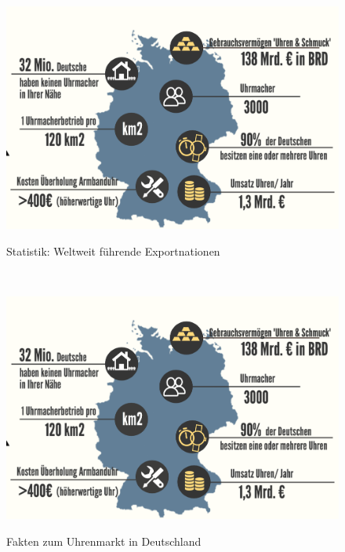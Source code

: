\begin{figure}[!h]
	\centering
	\includegraphics[scale=0.25]{statistiken/uhrenmarkt_info.png}
	\label{fig:abb1}
	\caption{Statistik: Weltweit führende Exportnationen} 
\end{figure}
\\
\begin{figure}[!h]
	\centering
	\includegraphics[scale=0.25]{statistiken/uhrenmarkt_info.png}
	\label{fig:abb1}
	\caption{Fakten zum Uhrenmarkt in Deutschland} 
\end{figure}

